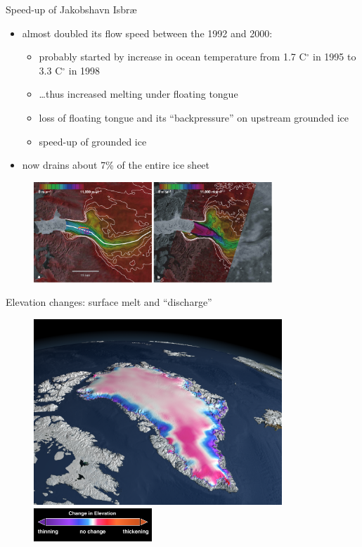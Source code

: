 \documentclass[intlimits]{beamer}
\begin{document}
\begin{frame}{Speed-up of Jakobshavn Isbr{\ae}}
  \begin{itemize}
    \item almost doubled its flow speed between the 1992 and 2000:
      \begin{itemize}
      \item probably started by increase in ocean temperature from 1.7 C$^{\circ}$ in 1995 to 3.3 C$^{\circ}$ in 1998
      \item \dots thus increased melting under floating tongue
      \item loss of floating tongue and its ``backpressure'' on upstream grounded ice
      \item speed-up of grounded ice
      \end{itemize}
    \item now drains about 7\% of the entire ice sheet
  \end{itemize}
  \begin{figure}
    \includegraphics[width=0.8\textwidth]{Joughin2004Fig2} \\
  \end{figure}
\end{frame}


\begin{frame}[label=ICESatElevation]{Elevation changes: surface melt and ``discharge''}
 \begin{figure}
   \includegraphics[height=7cm]{Greenland_thinning} \vspace{.1em}
   \includegraphics[height=1.25cm,angle=90]{ElevChangeColorBar} \\
  \end{figure}
\end{frame}
\end{document}
